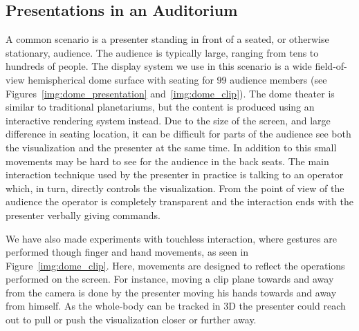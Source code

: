 \documentclass[review,journal]{vgtc}         %
\begin{document}
\subsection{Presentations in an Auditorium} \label{sec:largeaudience}
A common scenario is a presenter standing in front of a seated, or otherwise stationary, audience. 
The audience is typically large, ranging from tens to hundreds of people.
The display system we use in this scenario is a wide field-of-view hemispherical dome surface with seating for 99 audience members (see Figures~\ref{img:dome_presentation} and~\ref{img:dome_clip}).
The dome theater is similar to traditional planetariums, but the content is produced using an interactive rendering system instead.
Due to the size of the screen, and large difference in seating location, it can be difficult for parts of the audience see both the visualization and the presenter at the same time. 
In addition to this small movements may be hard to see for the audience in the back seats. 
The main interaction technique used by the presenter in practice is talking to an operator which, in turn, directly controls the visualization.
From the point of view of the audience the operator is completely transparent and the interaction ends with the presenter verbally giving commands.

We have also made experiments with touchless interaction, where gestures are performed though finger and hand movements, as seen in Figure~\ref{img:dome_clip}.
Here, movements are designed to reflect the operations performed on the screen.
For instance, moving a clip plane towards and away from the camera is done by the presenter moving his hands towards and away from himself. As the whole-body can be tracked in 3D the presenter could reach out to pull or push the visualization closer or further away.

\end{document}
